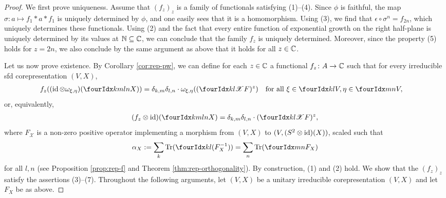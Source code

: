 \begin{proof}
  We first prove uniqueness.  Assume that $(f_{z})_{z}$ is a family of
  functionals satisfying (1)--(4).  Since $\phi$ is faithful, the map
  $\sigma\colon a \mapsto f_{1} \ast a \ast f_{1}$ is uniquely
  determined by $\phi$, and one easily sees that it is a homomorphism. Using
  (3), we find that $\epsilon \circ \sigma^n=f_{2n}$, which uniquely determines these functionals. Using (2) and the
  fact that every entire function of exponential growth on the right
  half-plane is uniquely determined by its values at $\mathbb{N} \subseteq \mathbb{C}$, we can conclude that the family $f_{z}$ is uniquely determined. Moreover, since the property (5) holds for $z = 2n$, we also conclude by the same argument as above that it holds for all $z\in \mathbb{C}$.

  Let us now prove existence.  By Corollary \ref{cor:rep-pw}, we can
  define for each $z\in \mathbb{C}$ a functional $f_{z} \colon A \to \mathbb{C}$ such
  that for every irreducible sfd corepresentation
  $(V,X)$,
    \begin{align*}
      f_{z}((\id \otimes \omega_{\xi,\eta})(\Gr{X}{k}{l}{m}{n})) &=
      \delta_{k,m}\delta_{l,n} \cdot
      \omega_{\xi,\eta}((\Gr{F}{k}{l}{}{\mathscr{X}})^{z}) \quad \text{for all }
      \xi \in \Gru{V}{k}{l},\eta \in
      \Gru{V}{m}{n},
    \end{align*}
    or, equivalently,
    \begin{align*}
      (f_{z} \otimes \id)(\Gr{X}{k}{l}{m}{n}) =
      \delta_{k,m}\delta_{l,n} \cdot (\Gr{F}{k}{l}{}{\mathscr{X}})^{z},
    \end{align*}
    where $F_{\mathscr{X}}$ is a non-zero positive operator implementing a morphism from $(V,X)$ to
    $(V, (S^{2} \otimes \operatorname{id})(X))$, scaled such that
    \begin{align*}
      \alpha_{X}:= \sum_{k} \Tr(\Gru{(F_{X}^{-1})}{k}{l}) = \sum_{n}
      \Tr(\Gru{F_{X}}{m}{n})
    \end{align*}
    for all $l,n$ (see Proposition \ref{prop:rep-f} and Theorem \ref{thm:rep-orthogonality}). By
    construction, (1) and (2) hold. We show that the $(f_{z})_{z}$ satisfy the
    assertions (3)--(7). 
    Throughout the following arguments, let 
    $(V,X)$ be a unitary irreducible corepresentation
    $(V,X)$ and let $F_{X}$ be as above.


\end{proof}
